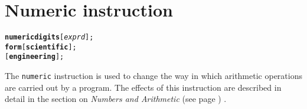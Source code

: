 \chapter{Numeric instruction}\label{refnumeric}
\index{,}
\begin{shaded}
\begin{alltt}
\textbf{numeric digits} [\emph{exprd}];
                \textbf{form} [\textbf{scientific}];
                          [\textbf{engineering}];
\end{alltt}
\end{shaded}
 The \texttt{numeric} instruction is used to change the way in which
arithmetic operations are carried out by a program.
The effects of this instruction are described in detail in the
section on  \emph{Numbers and Arithmetic} (see page \pageref{refnums}) .
